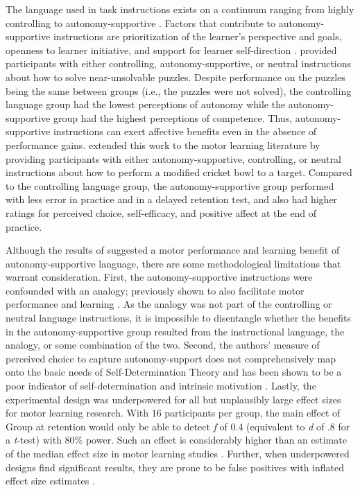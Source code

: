 \documentclass[man,floatsintext,donotrepeattitle,letterpaper,12pt]{apa7}
\begin{document}
The language used in task instructions exists on a continuum ranging from highly controlling to autonomy-supportive \autocite{reeve2009}. Factors that contribute to autonomy-supportive instructions are prioritization of the learner's perspective and goals, openness to learner initiative, and support for learner self-direction \autocite{reeve2009,reeve2011}. \textcite{reeve2011} provided participants with either controlling, autonomy-supportive, or neutral instructions about how to solve near-unsolvable puzzles. Despite performance on the puzzles being the same between groups (i.e., the puzzles were not solved), the controlling language group had the lowest perceptions of autonomy while the autonomy-supportive group had the highest perceptions of competence. Thus, autonomy-supportive instructions can exert affective benefits even in the absence of performance gains. \textcite{hooyman2014} extended this work to the motor learning literature by providing participants with either autonomy-supportive, controlling, or neutral instructions about how to perform a modified cricket bowl to a target. Compared to the controlling language group, the autonomy-supportive group performed with less error in practice and in a delayed retention test, and also had higher ratings for perceived choice, self-efficacy, and positive affect at the end of practice.

Although the results of \textcite{hooyman2014} suggested a motor performance and learning benefit of autonomy-supportive language, there are some methodological limitations that warrant consideration. First, the autonomy-supportive instructions were confounded with an analogy; previously shown to also facilitate motor performance and learning \autocites[e.g., ][]{liao2001}[see][for a review]{masters2020}. As the analogy was not part of the controlling or neutral language instructions, it is impossible to disentangle whether the benefits in the autonomy-supportive group resulted from the instructional language, the analogy, or some combination of the two. Second, the authors' measure of perceived choice to capture autonomy-support does not comprehensively map onto the basic needs of Self-Determination Theory \autocite{mcdonough2007,ng2011,ryan2020} and has been shown to be a poor indicator of self-determination and intrinsic motivation \autocite{reeve2003}. Lastly, the experimental design was underpowered for all but unplausibly large effect sizes for motor learning research. With 16 participants per group, the main effect of Group at retention would only be able to detect \emph{f} of 0.4 (equivalent to \emph{d} of .8 for a \emph{t}-test) with 80\% power. Such an effect is considerably higher than an estimate of the median effect size in motor learning studies \autocite[$d = 0.63$,][]{lohse2016}. Further, when underpowered designs find significant results, they are prone to be false positives with inflated effect size estimates \autocite{button2013,simmons2011}.
\end{document}
